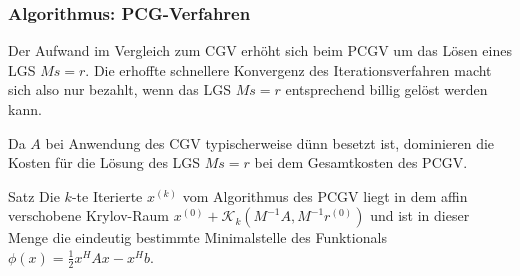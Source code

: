 \subsubsection{Algorithmus: PCG-Verfahren}

Der Aufwand im Vergleich zum CGV erhöht sich beim PCGV um das Lösen eines LGS $Ms=r$. Die erhoffte schnellere
Konvergenz des Iterationsverfahren macht sich also nur bezahlt, wenn das LGS $Ms=r$ entsprechend billig gelöst
werden kann. 

Da $A$ bei Anwendung des CGV typischerweise dünn besetzt ist, dominieren die Kosten für die Lösung des LGS $Ms=r$ 
bei dem Gesamtkosten des PCGV.

\begin{colbox}{Satz}
  Die $k$-te Iterierte $x^{(k)}$ vom Algorithmus des PCGV liegt in dem affin verschobene Krylov-Raum
  $x^{(0)} + \mathcal{K}_k(M^{-1}A, M^{-1}r^{(0)})$ und ist in dieser Menge die eindeutig bestimmte Minimalstelle
  des Funktionals $\phi(x) = \tfrac{1}{2}x^HAx-x^Hb$.
\end{colbox}

